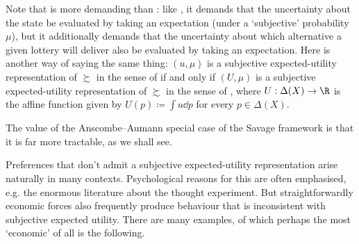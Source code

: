 Note that  is more demanding than : like , it demands that the uncertainty about the state be evaluated by taking an expectation (under a `subjective' probability $\mu$), but it additionally demands that the uncertainty about which alternative a given lottery will deliver also be evaluated by taking an expectation. Here is another way of saying the same thing: $(u,\mu)$ is a subjective expected-utility representation of $\succsim$ in the sense of  if and only if $(U,\mu)$ is a subjective expected-utility representation of $\succsim$ in the sense of , where $U : \Delta(X) \to \R$ is the affine function given by $U(p) \coloneqq \int u \dd p$ for every $p \in \Delta(X)$.

The value of the Anscombe--Aumann special case of the Savage framework is that it is far more tractable, as we shall see.

Preferences that don't admit a subjective expected-utility representation arise naturally in many contexts. Psychological reasons for this are often emphasised, e.g. the enormous literature about the \textcite{Ellsberg1961} thought experiment. But straightforwardly economic forces also frequently produce behaviour that is inconsistent with subjective expected utility. There are many examples, of which perhaps the most `economic' of all is the following.

